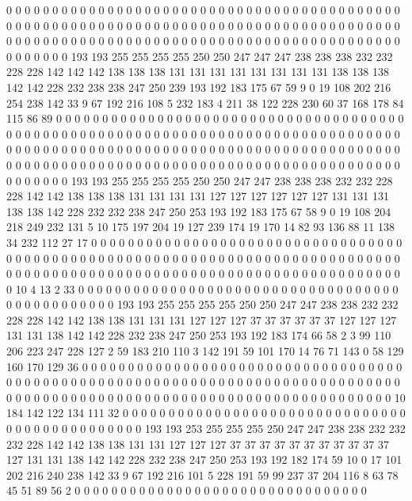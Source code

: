 0 0 0 0 0 0 0 0 0 0 0 0 0 0 0 0 0 0 0 0
0 0 0 0 0 0 0 0 0 0 0 0 0 0 0 0 0 0 0 0
0 0 0 0 0 0 0 0 0 0 0 0 0 0 0 0 0 0 0 0
0 0 0 0 0 0 0 0 0 0 0 0 0 0 0 0 0 0 0 0
0 0 0 0 0 0 0 0 0 0 0 0 0 0 0 0 0 0 0 0
0 0 0 0 0 0 0 0 0 0 0 0 0 0 0 0 0 0 0 0
0 0 0 0 0 0 0 0 0 0 0 0 0 0 0 0 193 193 255 255
255 255 250 250 247 247 247 238 238 238 232 232 228 228 142 142 142 138 138 138
131 131 131 131 131 131 131 131 138 138 138 142 142 228 232 238 238 247 250 239
193 192 183 175 67 59 9 0 19 108 202 216 254 238 142 33 9 67 192 216
108 5 232 183 4 211 38 122 228 230 60 37 168 178 84 115 86 89 0 0
0 0 0 0 0 0 0 0 0 0 0 0 0 0 0 0 0 0 0 0
0 0 0 0 0 0 0 0 0 0 0 0 0 0 0 0 0 0 0 0
0 0 0 0 0 0 0 0 0 0 0 0 0 0 0 0 0 0 0 0
0 0 0 0 0 0 0 0 0 0 0 0 0 0 0 0 0 0 0 0
0 0 0 0 0 0 0 0 0 0 0 0 0 0 0 0 0 0 0 0
0 0 0 0 0 0 0 0 0 0 0 0 0 0 0 0 0 0 0 0
0 0 0 0 0 0 0 0 0 0 0 0 0 0 0 0 0 0 0 0
0 0 0 0 0 0 0 0 0 0 0 0 0 0 0 0 0 0 0 0
0 0 0 0 0 0 0 0 0 0 0 0 193 193 255 255 255 255 250 250
247 247 238 238 238 232 232 228 228 142 142 138 138 138 131 131 131 131 127 127
127 127 127 127 131 131 131 138 138 142 228 232 232 238 247 250 253 193 192 183
175 67 58 9 0 19 108 204 218 249 232 131 5 10 175 197 204 19 127 239
174 19 170 14 82 93 136 88 11 138 34 232 112 27 17 0 0 0 0 0
0 0 0 0 0 0 0 0 0 0 0 0 0 0 0 0 0 0 0 0
0 0 0 0 0 0 0 0 0 0 0 0 0 0 0 0 0 0 0 0
0 0 0 0 0 0 0 0 0 0 0 0 0 0 0 0 0 0 0 0
0 0 0 0 0 0 0 0 0 0 0 0 0 0 0 0 0 0 0 0
0 0 0 0 0 0 0 0 0 0 0 0 0 0 0 0 0 0 0 0
0 0 0 0 0 0 0 0 0 0 0 0 0 0 0 0 10 4 13 2
33 0 0 0 0 0 0 0 0 0 0 0 0 0 0 0 0 0 0 0
0 0 0 0 0 0 0 0 0 0 0 0 0 0 0 0 0 0 0 0
0 0 0 0 0 0 0 0 193 193 255 255 255 255 250 250 247 247 238 238
232 232 228 228 142 142 138 138 131 131 131 127 127 127 37 37 37 37 37 37
127 127 127 131 131 138 142 142 228 232 238 247 250 253 193 192 183 174 66 58
2 3 99 110 206 223 247 228 127 2 59 183 210 110 3 142 191 59 101 170
14 76 71 143 0 58 129 160 170 129 36 0 0 0 0 0 0 0 0 0
0 0 0 0 0 0 0 0 0 0 0 0 0 0 0 0 0 0 0 0
0 0 0 0 0 0 0 0 0 0 0 0 0 0 0 0 0 0 0 0
0 0 0 0 0 0 0 0 0 0 0 0 0 0 0 0 0 0 0 0
0 0 0 0 0 0 0 0 0 0 0 0 0 0 0 0 0 0 0 0
0 0 0 0 0 0 0 0 0 0 0 0 0 0 0 0 0 0 0 0
0 0 0 0 0 0 0 0 0 0 0 10 184 142 122 134 111 32 0 0
0 0 0 0 0 0 0 0 0 0 0 0 0 0 0 0 0 0 0 0
0 0 0 0 0 0 0 0 0 0 0 0 0 0 0 0 0 0 0 0
0 0 0 0 193 193 253 255 255 255 250 247 247 238 238 232 232 232 228 142
142 138 138 131 131 127 127 127 37 37 37 37 37 37 37 37 37 37 37 127
131 131 138 142 142 228 232 238 247 250 253 193 192 182 174 59 10 0 17 101
202 216 240 238 142 33 9 67 192 216 101 5 228 191 59 99 237 37 204 116
8 63 78 45 51 89 56 2 0 0 0 0 0 0 0 0 0 0 0 0
0 0 0 0 0 0 0 0 0 0 0 0 0 0 0 0 0 0 0 0
